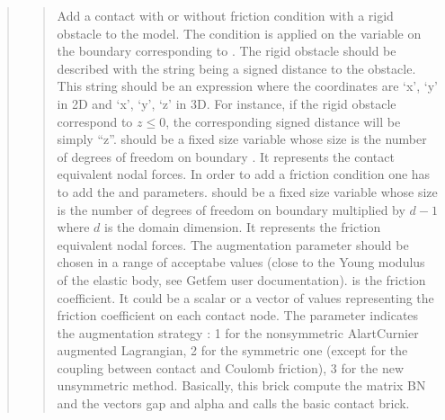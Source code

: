 \documentclass[a4paper,11pt,english]{sphinxmanual}
\begin{document}
\begin{quote}
\sphinxAtStartPar
{}
\begin{quote}

\sphinxAtStartPar
Add a contact with or without friction condition with a rigid obstacle
to the model. The condition is applied on the variable 
on the boundary corresponding to . The rigid obstacle should
be described with the string  being a signed distance to
the obstacle. This string should be an expression where the coordinates
are ‘x’, ‘y’ in 2D and ‘x’, ‘y’, ‘z’ in 3D. For instance, if the rigid
obstacle correspond to \(z \le 0\), the corresponding signed distance
will be simply “z”.  should be a fixed size variable whose size
is the number of degrees of freedom on boundary . It represents the
contact equivalent nodal forces. In order to add a friction condition
one has to add the  and  parameters.
 should be a fixed size variable whose size is
the number of degrees of freedom on boundary  multiplied by
\(d-1\) where \(d\) is the domain dimension. It represents
the friction equivalent nodal forces.
The augmentation parameter  should be chosen in a
range of acceptabe values (close to the Young modulus of the elastic
body, see Getfem user documentation).   is
the friction coefficient. It could be a scalar or a vector of values
representing the friction coefficient on each contact node.
The parameter 
indicates the augmentation strategy : 1 for the non\sphinxhyphen{}symmetric
Alart\sphinxhyphen{}Curnier augmented Lagrangian, 2 for the symmetric one (except for
the coupling between contact and Coulomb friction),
3 for the new unsymmetric method.
Basically, this brick compute the matrix BN
and the vectors gap and alpha and calls the basic contact brick.
\end{quote}

\sphinxAtStartPar
{}
\begin{quote}


\end{quote}
\end{quote}
\end{document}
